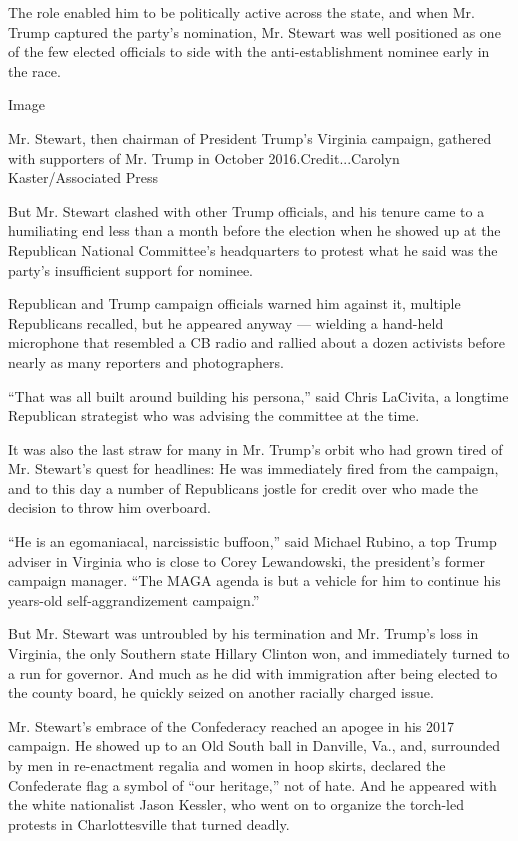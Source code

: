 The role enabled him to be politically active across the state, and when
Mr. Trump captured the party's nomination, Mr. Stewart was well
positioned as one of the few elected officials to side with the
anti-establishment nominee early in the race.

Image

Mr. Stewart, then chairman of President Trump's Virginia campaign,
gathered with supporters of Mr. Trump in October 2016.Credit...Carolyn
Kaster/Associated Press

But Mr. Stewart clashed with other Trump officials, and his tenure came
to a humiliating end less than a month before the election when he
showed up at the Republican National Committee's headquarters to protest
what he said was the party's insufficient support for nominee.

Republican and Trump campaign officials warned him against it, multiple
Republicans recalled, but he appeared anyway --- wielding a hand-held
microphone that resembled a CB radio and rallied about a dozen activists
before nearly as many reporters and photographers.

``That was all built around building his persona,'' said Chris LaCivita,
a longtime Republican strategist who was advising the committee at the
time.

It was also the last straw for many in Mr. Trump's orbit who had grown
tired of Mr. Stewart's quest for headlines: He was immediately fired
from the campaign, and to this day a number of Republicans jostle for
credit over who made the decision to throw him overboard.

``He is an egomaniacal, narcissistic buffoon,'' said Michael Rubino, a
top Trump adviser in Virginia who is close to Corey Lewandowski, the
president's former campaign manager. ``The MAGA agenda is but a vehicle
for him to continue his years-old self-aggrandizement campaign.''

But Mr. Stewart was untroubled by his termination and Mr. Trump's loss
in Virginia, the only Southern state Hillary Clinton won, and
immediately turned to a run for governor. And much as he did with
immigration after being elected to the county board, he quickly seized
on another racially charged issue.

Mr. Stewart's embrace of the Confederacy reached an apogee in his 2017
campaign. He showed up to an Old South ball in Danville, Va., and,
surrounded by men in re-enactment regalia and women in hoop skirts,
declared the Confederate flag a symbol of ``our heritage,'' not of hate.
And he appeared with the white nationalist Jason Kessler, who went on to
organize the torch-led protests in Charlottesville that turned deadly.

